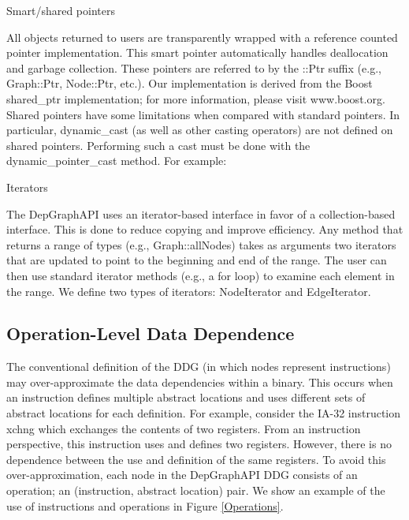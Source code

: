 \documentclass[12pt,titlepage]{article}
\begin{document}
\noindent Smart/shared pointers

All objects returned to users are transparently wrapped with a
reference counted pointer implementation. This smart pointer
automatically handles deallocation and garbage collection. These
pointers are referred to by the ::Ptr suffix (e.g., Graph::Ptr,
Node::Ptr, etc.). Our implementation is derived from the Boost
shared\_ptr implementation; for more information, please visit
www.boost.org. Shared pointers have some limitations when compared
with standard pointers. In particular, dynamic\_cast (as well as other
casting operators) are not defined on shared pointers. Performing such
a cast must be done with the dynamic\_pointer\_cast method. For example:

\normalfont\normalsize

\noindent Iterators 

The DepGraphAPI uses an iterator-based interface in favor of a
collection-based interface. This is done to reduce copying and improve
efficiency. Any method that returns a range of types (e.g.,
Graph::allNodes) takes as arguments two iterators that are updated to
point to the beginning and end of the range. The user can then use
standard iterator methods (e.g., a for loop) to examine each element
in the range. We define two types of iterators: NodeIterator and
EdgeIterator.

\subsection{Operation-Level Data Dependence}

The conventional definition of the DDG (in which nodes represent
instructions) may over-approximate the data dependencies within a
binary. This occurs when an instruction defines multiple abstract
locations and uses different sets of abstract locations for each
definition. For example, consider the IA-32 instruction xchng which
exchanges the contents of two registers. From an instruction
perspective, this instruction uses and defines two registers. However,
there is no dependence between the use and definition of the same
registers. To avoid this over-approximation, each node in the
DepGraphAPI DDG consists of an operation; an (instruction, abstract
location) pair. We show an example of the use of instructions and
operations in Figure \ref{Operations}.
\end{document}
